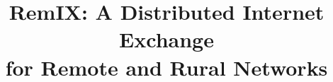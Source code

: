 \documentclass{sig-alternate-05-2015}
\begin{document}






%

\title{RemIX: A Distributed Internet Exchange\\for Remote and Rural Networks
}

%
%
%
%
%
\end{document}
